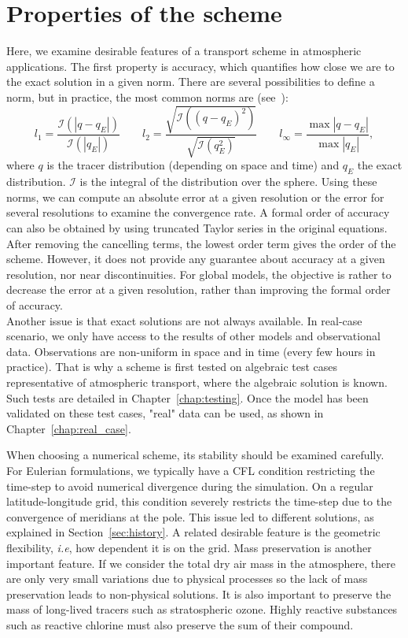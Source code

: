 \section{Properties of the scheme}
\label{sec:properties}
Here, we examine desirable features of a transport scheme in atmospheric
applications. The first property is accuracy, which quantifies how close we are to
the exact solution in a given norm. There are several possibilities to define a
norm, but in practice, the most common norms are (see~\cite{Williamson1992}):
\def\II{\mathcal{I}}
\begin{equation}
  l_1 = \frac{\II(|q-q_E|)}{\II(|q_E|)}
  \qquad
  l_2 = \frac{\sqrt{\II((q-q_E)^2)}}{\sqrt{\II(q_E^2)}}
  \qquad
  l_\infty = \frac{\max |q-q_E|}{\max{|q_E|}},
  \label{eqn:err_norms}
\end{equation}
where $q$ is the tracer distribution (depending on space and time) and $q_E$ the
exact distribution. $\II$ is the integral of the distribution over the sphere.
Using these norms, we can compute an absolute error at a given resolution or the
error for several resolutions to examine the convergence rate. A formal order of
accuracy can also be obtained by using truncated Taylor series in the original
equations. After removing the cancelling terms, the lowest order term gives the
order of the scheme. However, it does not provide any guarantee about accuracy at
a given resolution, nor near discontinuities. For global models, the objective
is rather to decrease the error at a given resolution, rather than improving the
formal order of accuracy.  \\
Another issue is that exact solutions are not always available. In real-case
scenario, we only have access to the results of other models and observational
data. Observations are non-uniform in space and in time (every few hours in
practice). That is why a scheme is first tested on algebraic test cases
representative of atmospheric transport, where the algebraic solution is known.
Such tests are detailed in Chapter~\ref{chap:testing}. Once the model has been
validated on these test cases, "real" data can be used, as shown in
Chapter~\ref{chap:real_case}.

When choosing a numerical scheme, its stability should be examined carefully.
For Eulerian formulations, we typically have a \gls{CFL} condition restricting
the time-step to avoid numerical divergence during the simulation. On a regular
latitude-longitude grid, this condition severely restricts the time-step due to
the convergence of meridians at the pole. This issue led to different solutions, as
explained in Section~\ref{sec:history}. A related desirable feature is the
geometric flexibility, \textit{i.e}, how dependent it is on the grid.
Mass preservation is another important feature. If we consider the total dry air
mass in the atmosphere, there are only very small variations due to physical
processes so the lack of mass preservation leads to non-physical solutions. It is
also important to preserve the mass of long-lived tracers such as stratospheric
ozone. Highly reactive substances such as reactive chlorine must also preserve
the sum of their compound.

